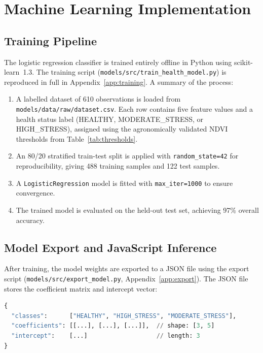 \section{Machine Learning Implementation}

\subsection{Training Pipeline}

The logistic regression classifier is trained entirely offline in Python using scikit-learn~1.3. The training script (\texttt{models/src/train\_health\_model.py}) is reproduced in full in Appendix~\ref{app:training}. A summary of the process:

\begin{enumerate}
  \item A labelled dataset of 610 observations is loaded from \texttt{models/data/raw/dataset.csv}. Each row contains five feature values and a health status label (HEALTHY, MODERATE\_STRESS, or HIGH\_STRESS), assigned using the agronomically validated NDVI thresholds from Table~\ref{tab:thresholds}.
  \item An 80/20 stratified train-test split is applied with \texttt{random\_state=42} for reproducibility, giving 488 training samples and 122 test samples.
  \item A \texttt{LogisticRegression} model is fitted with \texttt{max\_iter=1000} to ensure convergence.
  \item The trained model is evaluated on the held-out test set, achieving 97\% overall accuracy.
\end{enumerate}

\subsection{Model Export and JavaScript Inference}

After training, the model weights are exported to a JSON file using the export script (\texttt{models/src/export\_model.py}, Appendix~\ref{app:export}). The JSON file stores the coefficient matrix and intercept vector:

\begin{lstlisting}[language=Python, caption={Structure of the exported model JSON}, label={lst:modelstructure}]
{
  "classes":      ["HEALTHY", "HIGH_STRESS", "MODERATE_STRESS"],
  "coefficients": [[...], [...], [...]],  // shape: [3, 5]
  "intercept":    [...]                   // length: 3
}
\end{lstlisting}

